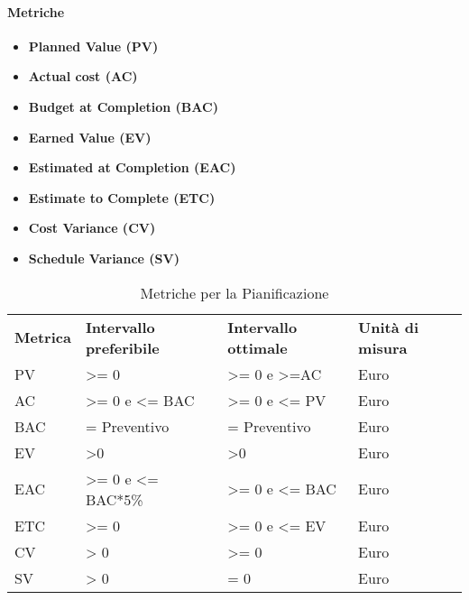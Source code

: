 \paragraph{Metriche}
\begin{itemize}
	\item \textbf{Planned Value (PV)}
	\item \textbf{Actual cost (AC)}
	\item \textbf{Budget at Completion (BAC)}
	\item \textbf{Earned Value (EV)}
	\item \textbf{Estimated at Completion (EAC)}
	\item \textbf{Estimate to Complete (ETC)}
	\item \textbf{Cost Variance	(CV)}
	\item \textbf{Schedule Variance	(SV)}
\end{itemize}

\renewcommand{\arraystretch}{2.2}
\begin{longtable}{|C{2cm}|C{3.5cm}|C{3.5cm}|C{3cm}|}

	\caption{Metriche per la Pianificazione }\\
	\hline

	\textbf{Metrica} & \textbf{Intervallo preferibile}  & \textbf{Intervallo ottimale} & \textbf{Unità di misura}
	\tabularnewline
	\endfirsthead

	PV & >= 0 & >= 0 e >=AC & Euro \\
	AC & >= 0 e <= BAC & >= 0 e <= PV & Euro \\
	BAC & = Preventivo  & = Preventivo & Euro \\
	EV & >0  & >0 & Euro \\
	EAC & >= 0 e <= BAC*5\%& >= 0 e <= BAC & Euro \\
	ETC & >= 0 & >= 0 e <= EV & Euro \\
	CV & > 0 & >= 0 & Euro \\
	SV & > 0 & = 0 & Euro \\
\end{longtable}
